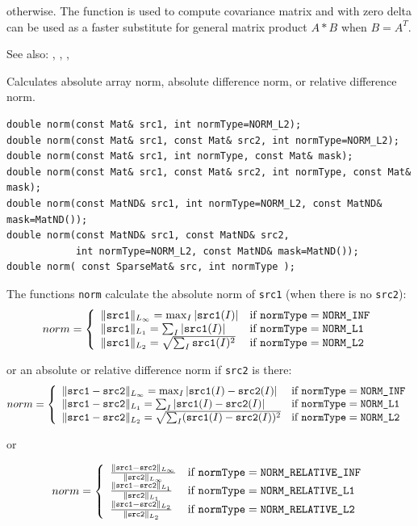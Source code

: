 otherwise. The function is used to compute covariance matrix and with zero delta can be used as a faster substitute for general matrix product $A*B$ when $B=A^T$.

See also: , , , 


\label{norm}
Calculates absolute array norm, absolute difference norm, or relative difference norm.

\begin{lstlisting}
double norm(const Mat& src1, int normType=NORM_L2);
double norm(const Mat& src1, const Mat& src2, int normType=NORM_L2);
double norm(const Mat& src1, int normType, const Mat& mask);
double norm(const Mat& src1, const Mat& src2, int normType, const Mat& mask);
double norm(const MatND& src1, int normType=NORM_L2, const MatND& mask=MatND());
double norm(const MatND& src1, const MatND& src2,
            int normType=NORM_L2, const MatND& mask=MatND());
double norm( const SparseMat& src, int normType );
\end{lstlisting}
\begin{description}
\end{description}

The functions \texttt{norm} calculate the absolute norm of \texttt{src1} (when there is no \texttt{src2}):
\[
norm = \left\{ \begin{array}{l l} \|\texttt{src1}\|_{L_{\infty}}    = \max_I |\texttt{src1}(I)| & \mbox{if $\texttt{normType} = \texttt{NORM\_INF}$}\\ \|\texttt{src1}\|_{L_1} = \sum_I |\texttt{src1}(I)| & \mbox{if $\texttt{normType} = \texttt{NORM\_L1}$}\\ \|\texttt{src1}\|_{L_2} = \sqrt{\sum_I \texttt{src1}(I)^2} & \mbox{if $\texttt{normType} = \texttt{NORM\_L2}$}\\ \end{array} \right.
\]

or an absolute or relative difference norm if \texttt{src2} is there:
\[
norm = \left\{ \begin{array}{l l} \|\texttt{src1}-\texttt{src2}\|_{L_{\infty}}    = \max_I |\texttt{src1}(I) - \texttt{src2}(I)| & \mbox{if $\texttt{normType} = \texttt{NORM\_INF}$}\\ \|\texttt{src1}-\texttt{src2}\|_{L_1} = \sum_I |\texttt{src1}(I) - \texttt{src2}(I)| & \mbox{if $\texttt{normType} = \texttt{NORM\_L1}$}\\ \|\texttt{src1}-\texttt{src2}\|_{L_2} = \sqrt{\sum_I (\texttt{src1}(I) - \texttt{src2}(I))^2} & \mbox{if $\texttt{normType} = \texttt{NORM\_L2}$}\\ \end{array} \right.
\]

or

\[
norm = \left\{ \begin{array}{l l} \frac{\|\texttt{src1}-\texttt{src2}\|_{L_{\infty}}    }{\|\texttt{src2}\|_{L_{\infty}}   } & \mbox{if $\texttt{normType} = \texttt{NORM\_RELATIVE\_INF}$}\\ \frac{\|\texttt{src1}-\texttt{src2}\|_{L_1} }{\|\texttt{src2}\|_{L_1}} & \mbox{if $\texttt{normType} = \texttt{NORM\_RELATIVE\_L1}$}\\ \frac{\|\texttt{src1}-\texttt{src2}\|_{L_2} }{\|\texttt{src2}\|_{L_2}} & \mbox{if $\texttt{normType} = \texttt{NORM\_RELATIVE\_L2}$}\\ \end{array} \right.
\]

